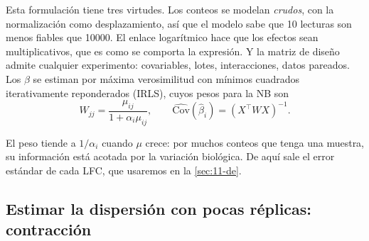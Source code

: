 \begin{simbolos}
\end{simbolos}

Esta formulación tiene tres virtudes. Los conteos se modelan \emph{crudos}, con la normalización como desplazamiento, así que el modelo sabe que 10 lecturas son menos fiables que \num{10000}. El enlace logarítmico hace que los efectos sean multiplicativos, que es como se comporta la expresión. Y la matriz de diseño admite cualquier experimento: covariables, lotes, interacciones, datos pareados. Los $\beta$ se estiman por máxima verosimilitud con mínimos cuadrados iterativamente reponderados (IRLS), cuyos pesos para la NB son
\begin{equation}\label{eq:11-irls}
W_{jj}=\frac{\mu_{ij}}{1+\alpha_i\mu_{ij}},\qquad
\widehat{\mathrm{Cov}}(\hat\beta_i)=\left(X^{\top}WX\right)^{-1}.
\end{equation}

\begin{simbolos}
\end{simbolos}

El peso tiende a $1/\alpha_i$ cuando $\mu$ crece: por muchos conteos que tenga una muestra, su información está acotada por la variación biológica. De aquí sale el error estándar de cada LFC, que usaremos en la \cref{sec:11-de}.

\subsection{Estimar la dispersión con pocas réplicas: contracción}

